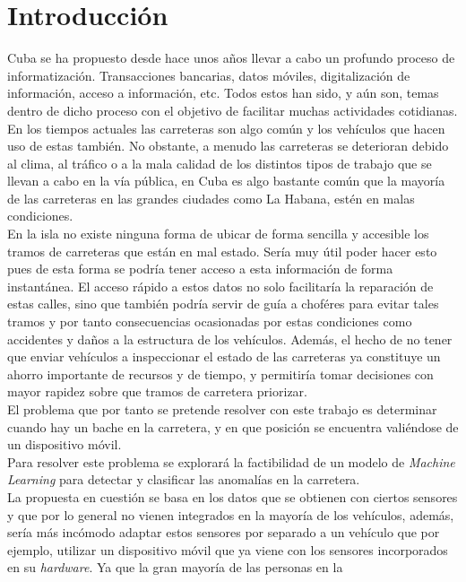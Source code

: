 \chapter*{Introducción}\label{chapter:introduction}

Cuba se ha propuesto desde hace unos años llevar a cabo un profundo proceso de informatización.
Transacciones bancarias, datos móviles, digitalización de información, acceso a información, etc. Todos
estos han sido, y aún son, temas dentro de dicho proceso con el objetivo de facilitar muchas actividades
cotidianas. En los tiempos actuales las carreteras son algo común y los vehículos que hacen uso de estas
también. No obstante, a menudo las carreteras se deterioran debido al clima, al tráfico o a la mala calidad 
de los distintos tipos de trabajo que se llevan a cabo en la vía pública, en Cuba es algo bastante común que
la mayoría de las carreteras en las grandes ciudades como La Habana, estén en malas condiciones.\\
\indent En la isla no existe ninguna forma de ubicar de forma sencilla y accesible los tramos de carreteras que están en
mal estado. Sería muy útil poder hacer esto pues de esta forma se podría tener acceso a esta información de forma
instantánea. El acceso rápido a estos datos no solo facilitaría la reparación de estas calles, sino que también
podría servir de guía a choféres para evitar tales tramos y por tanto consecuencias ocasionadas por estas condiciones
como accidentes y daños a la estructura de los vehículos. Además, el hecho de no tener que enviar vehículos a
inspeccionar el estado de las carreteras ya constituye un ahorro importante de recursos y de tiempo, y permitiría
tomar decisiones con mayor rapidez sobre que tramos de carretera priorizar.\\
\indent El problema que por tanto se pretende resolver con este trabajo es determinar cuando hay un bache en la carretera, y en que
posición se encuentra valiéndose de un dispositivo móvil.\\
\indent Para resolver este problema se explorará la factibilidad de un modelo de \emph{Machine Learning} para detectar y clasificar
las anomalías en la carretera.\\
\indent La propuesta en cuestión se basa en los datos que se obtienen con ciertos sensores y que por lo general no vienen integrados
en la mayoría de los vehículos, además, sería más incómodo adaptar estos sensores por separado a un vehículo que por ejemplo, utilizar
un dispositivo móvil que ya viene con los sensores incorporados en su \emph{hardware}. Ya que la gran mayoría de las personas en la
